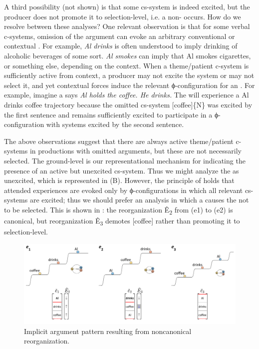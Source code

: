  A third possibility (not shown) is that some cs-system is indeed excited, but the producer does not promote it to selection-level, i.e. a non- occurs. How do we resolve between these analyses? One relevant observation is that for some verbal c-systems, omission of the argument can evoke an arbitrary conventional or contextual . For example, \textit{Al drinks} is often understood to imply drinking of alcoholic beverages of some sort. \textit{Al smokes} can imply that Al smokes cigarettes, or something else, depending on the context. When a theme/patient c-system is sufficiently active from context, a producer may not excite the system or may not select it, and yet contextual forces induce the relevant ϕ-con\-fig\-u\-ra\-tion for an . For example, imagine a  says \textit{Al holds the coffee. He drinks.} The  will experience a {\textbar}Al drinks coffee{\textbar} trajectory because the omitted cs-system [coffee]\{N\} was excited by the first sentence and remains sufficiently excited to participate in a ϕ-con\-fig\-u\-ra\-tion with systems excited by the second sentence.

  The above observations suggest that there are always active theme/patient c-systems in productions with omitted arguments, but these are not necessarily selected. The ground-level is our representational mechanism for indicating the presence of an active but unexcited cs-system. Thus we might analyze the  as unexcited, which is represented in {}(B). However, the principle of  holds that attended  experiences are evoked only by ϕ-con\-fig\-u\-ra\-tions in which all relevant cs-systems are excited; thus we should prefer an analysis in which a  causes the  not to be selected. This is shown in {}: the reorganization Ê\textsubscript{2} from (e1) to (e2) is canonical, but reorganization Ê\textsubscript{3} demotes [coffee] rather than promoting it to selection-level.

  
\begin{figure}
\includegraphics[width=\textwidth]{figures/Tilsen-img87.png}
\caption{Implicit argument pattern resulting from noncanonical reorganization.}
\label{fig:4:37}
\end{figure}
 

